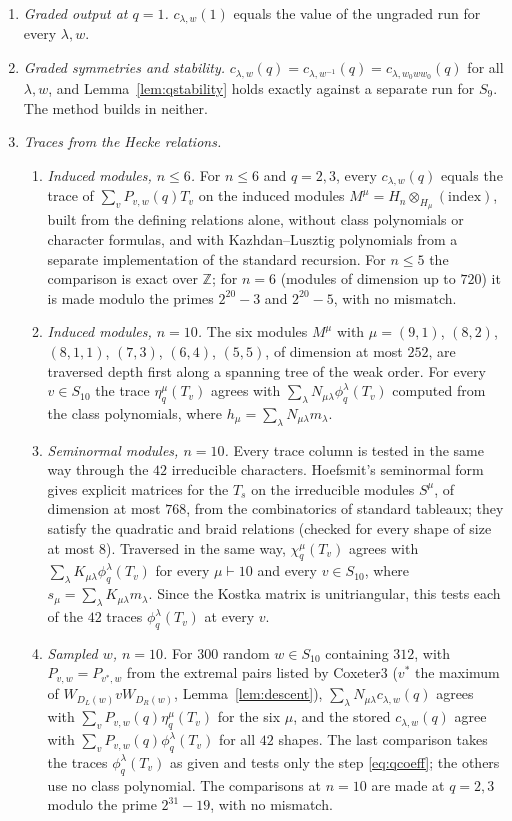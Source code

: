 \documentclass[11pt]{amsart}
\theoremstyle{definition}
\theoremstyle{remark}
\newcommand{\Z}{\mathbb{Z}}
\begin{document}
\begin{enumerate}
\item \emph{Graded output at $q=1$.} $c_{\lambda,w}(1)$ equals the value of the ungraded run for every $\lambda,w$.
\item \emph{Graded symmetries and stability.} $c_{\lambda,w}(q)=c_{\lambda,w^{-1}}(q)=c_{\lambda,w_0ww_0}(q)$ for all $\lambda,w$, and Lemma~\ref{lem:qstability} holds exactly against a separate run for $S_9$. The method builds in neither.
\item \emph{Traces from the Hecke relations.}
  \begin{enumerate}
  \item \emph{Induced modules, $n\le6$.} For $n\le6$ and $q=2,3$, every $c_{\lambda,w}(q)$ equals the trace of $\sum_vP_{v,w}(q)T_v$ on the induced modules $M^\mu=H_n\otimes_{H_\mu}(\text{index})$, built from the defining relations alone, without class polynomials or character formulas, and with Kazhdan--Lusztig polynomials from a separate implementation of the standard recursion. For $n\le5$ the comparison is exact over $\Z$; for $n=6$ (modules of dimension up to $720$) it is made modulo the primes $2^{20}-3$ and $2^{20}-5$, with no mismatch.
  \item \emph{Induced modules, $n=10$.} The six modules $M^\mu$ with $\mu=(9,1)$, $(8,2)$, $(8,1,1)$, $(7,3)$, $(6,4)$, $(5,5)$, of dimension at most $252$, are traversed depth first along a spanning tree of the weak order. For every $v\in S_{10}$ the trace $\eta^\mu_q(T_v)$ agrees with $\sum_\lambda N_{\mu\lambda}\phi^\lambda_q(T_v)$ computed from the class polynomials, where $h_\mu=\sum_\lambda N_{\mu\lambda}m_\lambda$.
  \item \emph{Seminormal modules, $n=10$.} Every trace column is tested in the same way through the $42$ irreducible characters. Hoefsmit's seminormal form \cite{Hoe74,Ram97} gives explicit matrices for the $T_s$ on the irreducible modules $S^\mu$, of dimension at most $768$, from the combinatorics of standard tableaux; they satisfy the quadratic and braid relations (checked for every shape of size at most $8$). Traversed in the same way, $\chi^\mu_q(T_v)$ agrees with $\sum_\lambda K_{\mu\lambda}\phi^\lambda_q(T_v)$ for every $\mu\vdash10$ and every $v\in S_{10}$, where $s_\mu=\sum_\lambda K_{\mu\lambda}m_\lambda$. Since the Kostka matrix is unitriangular, this tests each of the $42$ traces $\phi^\lambda_q(T_v)$ at every $v$.
  \item \emph{Sampled $w$, $n=10$.} For $300$ random $w\in S_{10}$ containing $312$, with $P_{v,w}=P_{v^*,w}$ from the extremal pairs listed by \textsf{Coxeter3} ($v^*$ the maximum of $W_{D_L(w)}vW_{D_R(w)}$, Lemma~\ref{lem:descent}), $\sum_\lambda N_{\mu\lambda}c_{\lambda,w}(q)$ agrees with $\sum_vP_{v,w}(q)\eta^\mu_q(T_v)$ for the six $\mu$, and the stored $c_{\lambda,w}(q)$ agree with $\sum_vP_{v,w}(q)\phi^\lambda_q(T_v)$ for all $42$ shapes. The last comparison takes the traces $\phi^\lambda_q(T_v)$ as given and tests only the step \eqref{eq:qcoeff}; the others use no class polynomial. The comparisons at $n=10$ are made at $q=2,3$ modulo the prime $2^{31}-19$, with no mismatch.

\end{enumerate}
\end{enumerate}
\end{document}

